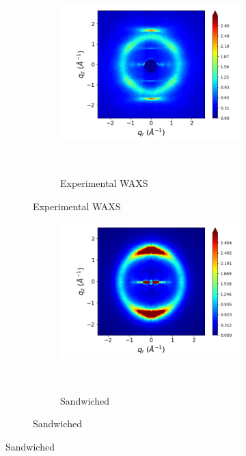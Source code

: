 \documentclass{article}
\begin{document}
  \begin{figure}[htb]
	\centering
	\begin{subfigure}{0.4\linewidth}
	\centering
			\begin{subfigure}{\textwidth}
		       		\centering
	        		\includegraphics[width=\linewidth]{WAXS_raw_jet.png}
	        		\caption{Experimental WAXS}~\label{fig:offset_tails}
			\end{subfigure}
	\end{subfigure}
	\begin{subfigure}{0.28\linewidth}
			\begin{subfigure}{\textwidth}
			\centering
		        	\includegraphics[width=\linewidth]{rzplot_layered_300K_jet.png}
			        \caption{Sandwiched}~\label{fig:rzplot_layered_300K}
			\end{subfigure}
			

\end{subfigure}
\end{figure}
\end{document}
